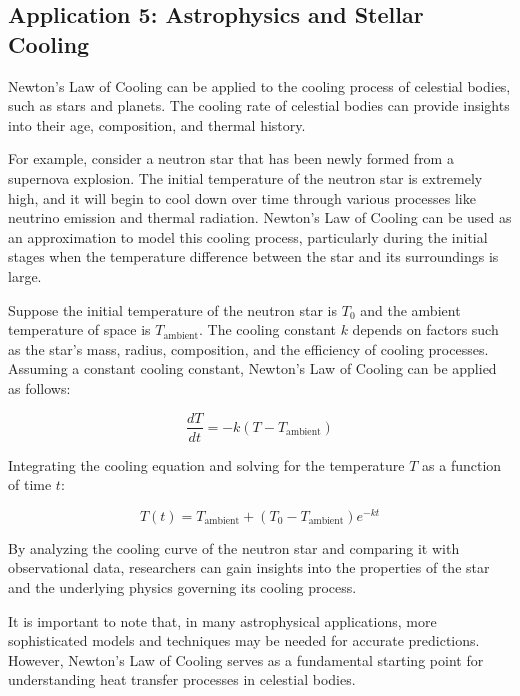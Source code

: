 \documentclass[12pt, a4paper]{article}
\begin{document}
\subsection{Application 5: Astrophysics and Stellar Cooling}
Newton's Law of Cooling can be applied to the cooling process of celestial bodies, such as stars and planets. The cooling rate of celestial bodies can provide insights into their age, composition, and thermal history.

For example, consider a neutron star that has been newly formed from a supernova explosion. The initial temperature of the neutron star is extremely high, and it will begin to cool down over time through various processes like neutrino emission and thermal radiation. Newton's Law of Cooling can be used as an approximation to model this cooling process, particularly during the initial stages when the temperature difference between the star and its surroundings is large.

Suppose the initial temperature of the neutron star is $T_0$ and the ambient temperature of space is $T_{\text{ambient}}$. The cooling constant $k$ depends on factors such as the star's mass, radius, composition, and the efficiency of cooling processes. Assuming a constant cooling constant, Newton's Law of Cooling can be applied as follows:

\begin{equation}
\frac{dT}{dt} = -k(T - T_{\text{ambient}})
\end{equation}

Integrating the cooling equation and solving for the temperature $T$ as a function of time $t$:

\begin{equation}
T(t) = T_{\text{ambient}} + (T_0 - T_{\text{ambient}}) e^{-kt}
\end{equation}

By analyzing the cooling curve of the neutron star and comparing it with observational data, researchers can gain insights into the properties of the star and the underlying physics governing its cooling process.

\vspace{12pt}

It is important to note that, in many astrophysical applications, more sophisticated models and techniques may be needed for accurate predictions. However, Newton's Law of Cooling serves as a fundamental starting point for understanding heat transfer processes in celestial bodies.
\end{document}
